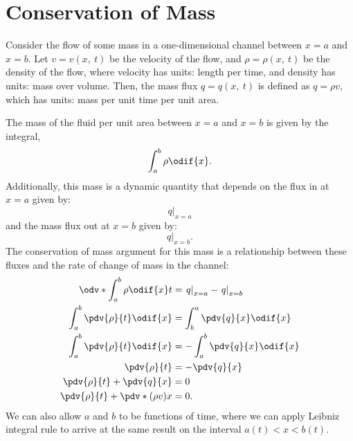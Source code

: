 \documentclass{article}
\theoremstyle{definition}
\begin{document}
\section{Conservation of Mass}\label{sec:conservation-of-mass}
Consider the flow of some mass in a one-dimensional channel between \(x
= a\) and \(x = b\). Let \(v = v\left( x,\: t \right)\) be the velocity
of the flow, and \(\rho = \rho\left( x,\: t \right)\) be the density of
the flow, where velocity has units: length per time, and density has
units: mass over volume. Then, the mass flux \(q = q\left( x,\: t
\right)\) is defined as \(q = \rho v\), which has units: mass per unit
time per unit area.

The mass of the fluid per unit area between \(x = a\) and \(x = b\) is
given by the integral,
\begin{equation*}
    \int_a^b \rho \odif{x}.
\end{equation*}
Additionally, this mass is a dynamic quantity that depends on the flux
in at \(x = a\) given by:
\begin{equation*}
    \left. q \right|_{x = a}
\end{equation*}
and the mass flux out at \(x = b\) given by:
\begin{equation*}
    \left. q \right|_{x = b}.
\end{equation*}
The conservation of mass argument for this mass is a relationship
between these fluxes and the rate of change of mass in the channel:
\begin{align*}
    \odv*{\int_a^b \rho \odif{x}}{t}                & = \left. q \right|_{x = a} - \left. q \right|_{x = b} \\
    \int_a^b \pdv{\rho}{t} \odif{x}                 & = \int_b^a \pdv{q}{x} \odif{x}                        \\
    \int_a^b \pdv{\rho}{t} \odif{x}                 & = - \int_a^b \pdv{q}{x} \odif{x}                      \\
    \pdv{\rho}{t}                                   & = - \pdv{q}{x}                                        \\
    \pdv{\rho}{t} + \pdv{q}{x}                      & = 0                                                   \\
    \pdv{\rho}{t} + \pdv*{\left( \rho v \right)}{x} & = 0.
\end{align*}
We can also allow \(a\) and \(b\) to be functions of time, where we can
apply Leibniz integral rule to arrive at the same result on the interval
\(a\left( t \right) < x < b\left( t \right)\).
\end{document}
